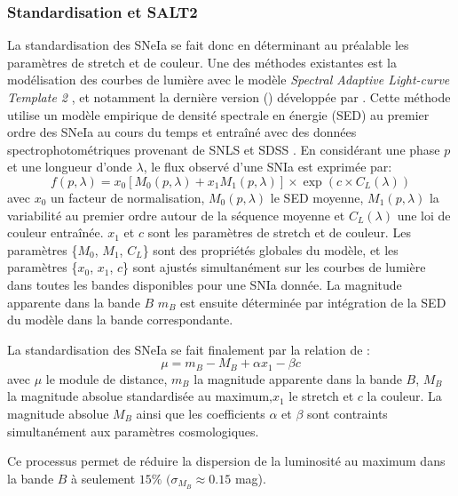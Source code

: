 \documentclass[../main/main.tex]{subfiles}
\begin{document}
\subsubsection{Standardisation et SALT2}

La standardisation des SNeIa se fait donc en déterminant au préalable
les paramètres de stretch et de couleur. Une des méthodes existantes est
la modélisation des courbes de lumière avec le modèle \textit{Spectral
  Adaptive Light-curve Template 2}
\citep[SALT2][]{Guysalt2005,Guysalt22007}, et notamment la dernière
version () développée par \citet{Betoule2014}. 
Cette méthode utilise un modèle empirique de densité spectrale en
énergie (SED) au premier ordre des SNeIa au cours du temps et entraîné avec des données spectrophotométriques provenant de
SNLS et SDSS \citep{Betoule2014}. En considérant une phase $p$ et une longueur d'onde
$\lambda$, le flux observé d'une SNIa est exprimée par:
\begin{equation}
  \label{eq:saltflux}
  f(p,\lambda)=x_{0}\left[M_{0}(p,\lambda)+x_{1}M_{1}(p,\lambda)\right]\times\exp\left(c\times
    C_{L}(\lambda)\right)
\end{equation}
avec $x_{0}$ un facteur de normalisation, $M_{0}(p,\lambda)$ le SED
moyenne, $M_{1}(p,\lambda)$ la variabilité au premier ordre autour de la
séquence moyenne et $C_{L}(\lambda)$ une loi de couleur
entraînée. $x_{1}$ et $c$ sont les paramètres de stretch et de couleur.
Les paramètres \{$M_{0}$, $M_{1}$, $C_{L}$\} sont des propriétés
globales du modèle, et les paramètres \{$x_{0}$, $x_{1}$, $c$\} sont
ajustés simultanément sur les courbes de lumière dans toutes les bandes
disponibles pour une SNIa donnée. La magnitude apparente dans la bande
$B$ $m_{B}$ est ensuite déterminée par intégration de la SED du modèle
dans la bande correspondante.


La standardisation des SNeIa se fait finalement par la relation de \citet{Tripp1998}:
\begin{equation}
  \label{eq:mustandard}
  \mu  = m_{B}- M_{B}+\alpha x_{1}-\beta c
\end{equation}
avec $\mu$ le module de distance, $m_{B}$ la magnitude apparente dans la
bande $B$, $M_{B}$ la magnitude absolue standardisée au maximum,$x_{1}$
le stretch et $c$ la couleur. La magnitude absolue $M_{B}$ ainsi que les coefficients $\alpha$ et $\beta$ sont
contraints simultanément aux paramètres cosmologiques.

Ce processus permet de réduire la dispersion de la luminosité au maximum
dans la bande $B$ à seulement $15\%$ $(\sigma_{M_{B}}\approx0.15$ mag).
\end{document}
